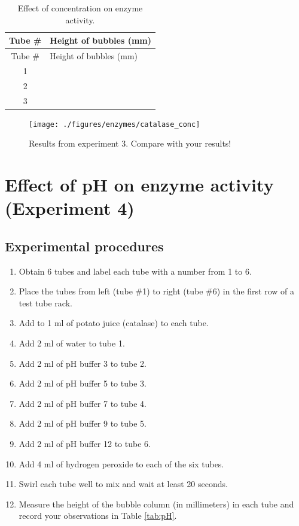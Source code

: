 \begin{longtable}[]{@{}cl@{}}
\caption{\label{tab:concentration} Effect of concentration on enzyme
activity.}\tabularnewline
\toprule
Tube \# & Height of bubbles (mm)\tabularnewline
\midrule
\endfirsthead
\toprule
Tube \# & Height of bubbles (mm)\tabularnewline
\midrule
\endhead
1 &\tabularnewline
2 &\tabularnewline
3 &\tabularnewline
\bottomrule
\end{longtable}

\begin{figure}

{\centering \texttt{[image: ./figures/enzymes/catalase\_conc]} 

}

\caption{Results from experiment 3. Compare with your results!}\label{fig:conc}
\end{figure}

\section{Effect of pH on enzyme activity (Experiment
4)}\label{effect-of-ph-on-enzyme-activity-experiment-4}

\subsection{Experimental procedures}\label{experimental-procedures-23}

\begin{enumerate}
\def\labelenumi{\arabic{enumi}.}
\tightlist
\item
  Obtain 6 tubes and label each tube with a number from 1 to 6.
\item
  Place the tubes from left (tube \#1) to right (tube \#6) in the first
  row of a test tube rack.
\item
  Add to 1 ml of potato juice (catalase) to each tube.
\item
  Add 2 ml of water to tube 1.
\item
  Add 2 ml of pH buffer 3 to tube 2.
\item
  Add 2 ml of pH buffer 5 to tube 3.
\item
  Add 2 ml of pH buffer 7 to tube 4.
\item
  Add 2 ml of pH buffer 9 to tube 5.
\item
  Add 2 ml of pH buffer 12 to tube 6.
\item
  Add 4 ml of hydrogen peroxide to each of the six tubes.
\item
  Swirl each tube well to mix and wait at least 20 seconds.
\item
  Measure the height of the bubble column (in millimeters) in each tube
  and record your observations in Table \ref{tab:pH}.
\end{enumerate}

